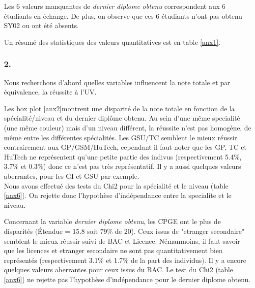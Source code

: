 \documentclass{article}
\begin{document}
Les 6 valeurs manquantes de \textit{dernier diplome obtenu} correspondent aux 6 étudiants en échange. De plus, on observe que ces 6 étudiants n'ont pas obtenu SY02 ou ont été absents.

Un résumé des statistiques des valeurs quantitatives est en table \lbrack\ref{anx1}\rbrack.

\subsubsection*{2.} 

Nous recherchons d'abord quelles variables influencent la note totale et par équivalence, la réussite à l'UV.

Les box plot \lbrack\ref{anx2}\rbrack montrent une disparité de la note totale en fonction de la spécialité/niveau et du dernier diplôme obtenu.
Au sein d'une même specialité (une même couleur) mais d'un niveau différent, la réussite n'est pas homogène, de même entre les différentes spécialités. 
Les GSU/TC semblent le mieux réussir contrairement aux GP/GSM/HuTech, cependant il faut noter que les GP, TC et HuTech ne représentent qu'une petite partie des indivus (respectivement 5.4\%, 3.7\% et 0.3\%) donc ce n'est pas très représentatif.
Il y a aussi quelques valeurs aberrantes, pour les GI et GSU par exemple.\\
Nous avons effectué des tests du Chi2 pour la spécialité et le niveau (table \lbrack\ref{anx6}\rbrack). On rejette donc l'hypothèse d'indépendance entre la specialite et le niveau.

Concernant la variable \textit{dernier diplome obtenu}, les CPGE ont le plus de disparités (Étendue = 15.8 soit 79\% de 20). Ceux issus de "etranger secondaire" semblent le mieux réussir suivi de BAC et Licence. 
Némanmoins, il faut savoir que les licences et etranger secondaire ne sont pas quantitativement bien représentés (respectivement 3.1\% et 1.7\% de la part des individus). Il y a encore quelques valeurs aberrantes pour ceux issus du BAC. Le test du Chi2 (table \lbrack\ref{anx6}\rbrack) ne rejette pas l'hypothèse d'indépendance pour le dernier diplome obtenu.
\end{document}
